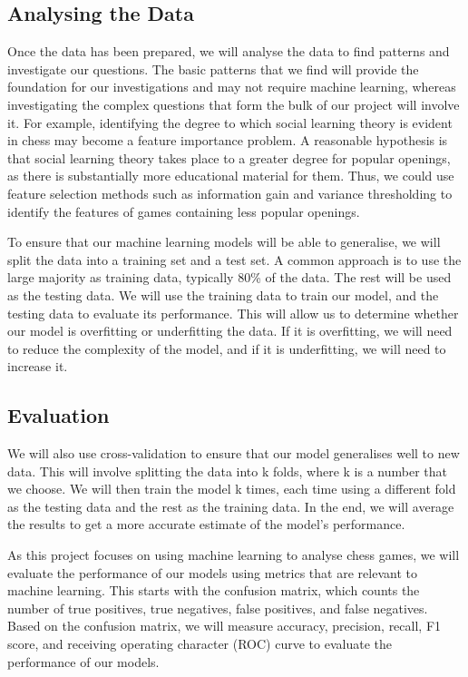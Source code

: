 \documentclass[%
 superscriptaddress,
showpacs,preprintnumbers,
 amsmath,
 amssymb,
 aps,
 pra,
showkeys,
onecolumn,
notitlepage,
11pt,
tightenlines      %
]{revtex4-1}
\begin{document}
\subsection{Analysing the Data}
Once the data has been prepared, we will analyse the data to find patterns and investigate our questions. The basic patterns that we find will provide the foundation for our investigations and may not require machine learning, whereas investigating the complex questions that form the bulk of our project will involve it. For example, identifying the degree to which social learning theory is evident in chess may become a feature importance problem. A reasonable hypothesis is that social learning theory takes place to a greater degree for popular openings, as there is substantially more educational material for them. Thus, we could use feature selection methods such as information gain and variance thresholding to identify the features of games containing less popular openings.

To ensure that our machine learning models will be able to generalise, we will split the data into a training set and a test set. A common approach is to use the large majority as training data, typically 80\% of the data. The rest will be used as the testing data. We will use the training data to train our model, and the testing data to evaluate its performance. This will allow us to determine whether our model is overfitting or underfitting the data. If it is overfitting, we will need to reduce the complexity of the model, and if it is underfitting, we will need to increase it.


\subsection{Evaluation}

We will also use cross-validation to ensure that our model generalises well to new data. This will involve splitting the data into k folds, where k is a number that we choose. We will then train the model k times, each time using a different fold as the testing data and the rest as the training data. In the end, we will average the results to get a more accurate estimate of the model's performance.

As this project focuses on using machine learning to analyse chess games, we will evaluate the performance of our models using metrics that are relevant to machine learning. This starts with the confusion matrix, which counts the number of true positives, true negatives, false positives, and false negatives. Based on the confusion matrix, we will measure accuracy, precision, recall, F1 score, and receiving operating character (ROC) curve to evaluate the performance of our models.
\end{document}
